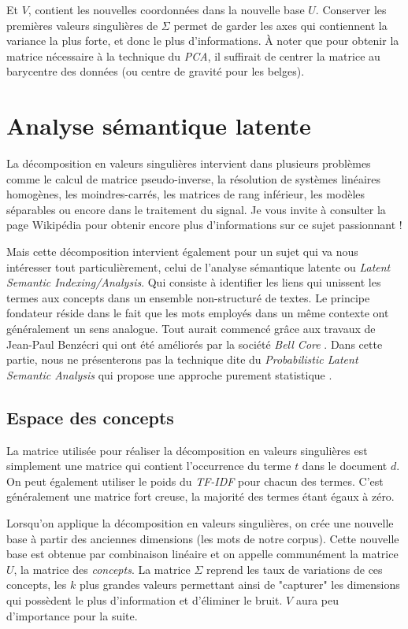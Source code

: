 Et $V$, contient les nouvelles coordonnées dans la nouvelle base $U$. Conserver les premières valeurs singulières de $\Sigma$ permet de garder les axes qui contiennent la variance la plus forte, et donc le plus d'informations. À noter que pour obtenir la matrice nécessaire à la technique du \textit{PCA}, il suffirait de centrer la matrice au barycentre des données (ou centre de gravité pour les belges).

\section{Analyse sémantique latente}

La décomposition en valeurs singulières intervient dans plusieurs problèmes comme le calcul de matrice pseudo-inverse, la résolution de systèmes linéaires homogènes, les moindres-carrés, les matrices de rang inférieur, les modèles séparables ou encore dans le traitement du signal. Je vous invite à consulter la page Wikipédia pour obtenir encore plus d'informations sur ce sujet passionnant !

Mais cette décomposition intervient également pour un sujet qui va nous intéresser tout particulièrement, celui de l'analyse sémantique latente ou \textit{Latent Semantic Indexing/Analysis}. Qui consiste à identifier les liens qui unissent les termes aux concepts dans un ensemble non-structuré de textes. Le principe fondateur réside dans le fait que les mots employés dans un même contexte ont généralement un sens analogue. Tout aurait commencé grâce aux travaux de Jean-Paul Benzécri \cite{benzecri1976analyse} qui ont été améliorés par la société \textit{Bell Core} \cite{deerwester1989computer}. Dans cette partie, nous ne présenterons pas la technique dite du \textit{Probabilistic Latent Semantic Analysis} qui propose une approche purement statistique \cite{hofmann1999probabilistic}.

\subsection{Espace des concepts}

La matrice utilisée pour réaliser la décomposition en valeurs singulières est simplement une matrice qui contient l'occurrence du terme $t$ dans le document $d$. On peut également utiliser le poids du \textit{TF-IDF} pour chacun des termes. C'est généralement une matrice fort creuse, la majorité des termes étant égaux à zéro.

Lorsqu'on applique la décomposition en valeurs singulières, on crée une nouvelle base
 à partir des anciennes dimensions (les mots de notre corpus). Cette nouvelle base est obtenue par combinaison linéaire et on appelle communément la matrice $U$, la matrice des \textit{concepts}. La matrice $\Sigma$ reprend les taux de variations de ces concepts, les $k$ plus grandes valeurs permettant ainsi de "capturer" les dimensions qui possèdent le plus d'information et d'éliminer le bruit. $V$ aura peu d'importance pour la suite.


